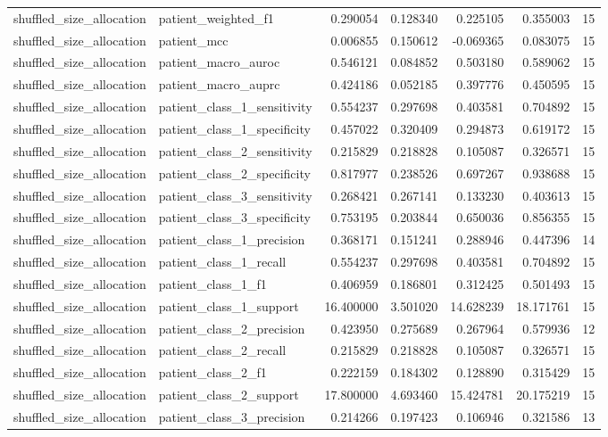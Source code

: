 \begin{tabular}{llrrrrr}
shuffled_size_allocation & patient_weighted_f1 & 0.290054 & 0.128340 & 0.225105 & 0.355003 & 15 \\
shuffled_size_allocation & patient_mcc & 0.006855 & 0.150612 & -0.069365 & 0.083075 & 15 \\
shuffled_size_allocation & patient_macro_auroc & 0.546121 & 0.084852 & 0.503180 & 0.589062 & 15 \\
shuffled_size_allocation & patient_macro_auprc & 0.424186 & 0.052185 & 0.397776 & 0.450595 & 15 \\
shuffled_size_allocation & patient_class_1_sensitivity & 0.554237 & 0.297698 & 0.403581 & 0.704892 & 15 \\
shuffled_size_allocation & patient_class_1_specificity & 0.457022 & 0.320409 & 0.294873 & 0.619172 & 15 \\
shuffled_size_allocation & patient_class_2_sensitivity & 0.215829 & 0.218828 & 0.105087 & 0.326571 & 15 \\
shuffled_size_allocation & patient_class_2_specificity & 0.817977 & 0.238526 & 0.697267 & 0.938688 & 15 \\
shuffled_size_allocation & patient_class_3_sensitivity & 0.268421 & 0.267141 & 0.133230 & 0.403613 & 15 \\
shuffled_size_allocation & patient_class_3_specificity & 0.753195 & 0.203844 & 0.650036 & 0.856355 & 15 \\
shuffled_size_allocation & patient_class_1_precision & 0.368171 & 0.151241 & 0.288946 & 0.447396 & 14 \\
shuffled_size_allocation & patient_class_1_recall & 0.554237 & 0.297698 & 0.403581 & 0.704892 & 15 \\
shuffled_size_allocation & patient_class_1_f1 & 0.406959 & 0.186801 & 0.312425 & 0.501493 & 15 \\
shuffled_size_allocation & patient_class_1_support & 16.400000 & 3.501020 & 14.628239 & 18.171761 & 15 \\
shuffled_size_allocation & patient_class_2_precision & 0.423950 & 0.275689 & 0.267964 & 0.579936 & 12 \\
shuffled_size_allocation & patient_class_2_recall & 0.215829 & 0.218828 & 0.105087 & 0.326571 & 15 \\
shuffled_size_allocation & patient_class_2_f1 & 0.222159 & 0.184302 & 0.128890 & 0.315429 & 15 \\
shuffled_size_allocation & patient_class_2_support & 17.800000 & 4.693460 & 15.424781 & 20.175219 & 15 \\
shuffled_size_allocation & patient_class_3_precision & 0.214266 & 0.197423 & 0.106946 & 0.321586 & 13 \\

\end{tabular}
